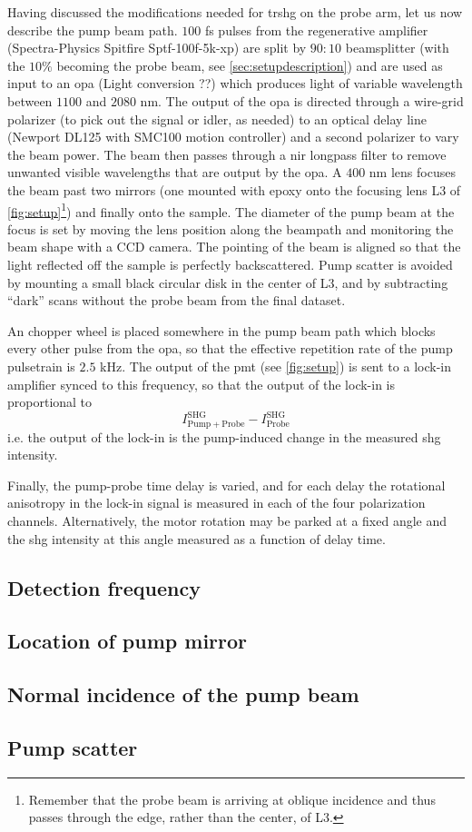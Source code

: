 Having discussed the modifications needed for \gls{trshg} on the probe arm, let us now describe the pump beam path.
$100$ \si{fs} pulses from the regenerative amplifier (Spectra-Physics Spitfire Sptf-100f-5k-xp) are split by $90:10$ beamsplitter (with the $10\%$ becoming the probe beam, see \cref{sec:setupdescription}) and are used as input to an \gls{opa} (Light conversion ??) which produces light of variable wavelength between $1100$ and $2080$ \si{nm}.
The output of the \gls{opa} is directed through a wire-grid polarizer (to pick out the signal or idler, as needed) to an optical delay line (Newport DL125 with SMC100 motion controller) and a second polarizer to vary the beam power.
The beam then passes through a \gls{nir} longpass filter to remove unwanted visible wavelengths that are output by the \gls{opa}.
A $400$ \si{nm} lens focuses the beam past two mirrors (one mounted with epoxy onto the focusing lens L3 of \cref{fig:setup}\footnote{Remember that the probe beam is arriving at oblique incidence and thus passes through the edge, rather than the center, of L3.}) and finally onto the sample.
The diameter of the pump beam at the focus is set by moving the lens position along the beampath and monitoring the beam shape with a CCD camera.
The pointing of the beam is aligned so that the light reflected off the sample is perfectly backscattered.
Pump scatter is avoided by mounting a small black circular disk in the center of L3, and by subtracting ``dark'' scans without the probe beam from the final dataset.

An chopper wheel is placed somewhere in the pump beam path which blocks every other pulse from the \gls{opa}, so that the effective repetition rate of the pump pulsetrain is $2.5$ \si{kHz}.
The output of the \gls{pmt} (see \cref{fig:setup}) is sent to a lock-in amplifier synced to this frequency, so that the output of the lock-in is proportional to
\begin{equation}
I^\mathrm{SHG}_{\mathrm{Pump}+\mathrm{Probe}} - I^\mathrm{SHG}_\mathrm{Probe}
\end{equation}
i.e. the output of the lock-in is the pump-induced change in the measured \gls{shg} intensity.

Finally, the pump-probe time delay is varied, and for each delay the rotational anisotropy in the lock-in signal is measured in each of the four polarization channels.
Alternatively, the motor rotation may be parked at a fixed angle and the \gls{shg} intensity at this angle measured as a function of delay time.

\subsection{Detection frequency}

\subsection{Location of pump mirror}

\subsection{Normal incidence of the pump beam}

\subsection{Pump scatter}

